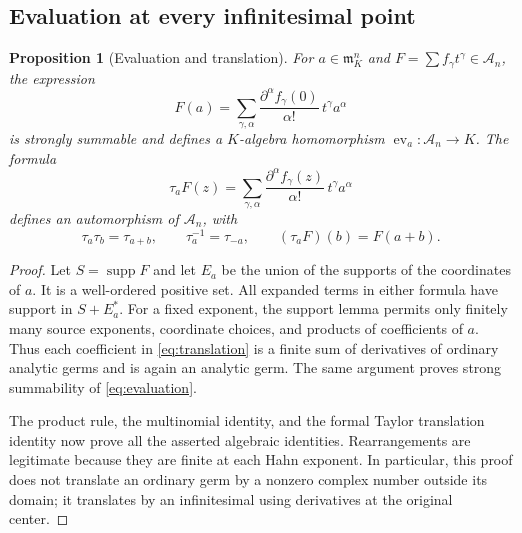 \documentclass[11pt,letterpaper]{article}
\newtheorem{proposition}[proposition]{Proposition}
\theoremstyle{definition}
\theoremstyle{remark}
\newcommand{\A}{\mathscr A}
\newcommand{\m}{\mathfrak m}
\newcommand{\supp}{\operatorname{supp}}
\newcommand{\ev}{\operatorname{ev}}
\numberwithin{equation}{section}
\begin{document}
\subsection{Evaluation at every infinitesimal point}
\begin{proposition}[Evaluation and translation]\label{prop:translation}
For $a\in\m_K^n$ and $F=\sum f_\gamma t^\gamma\in\A_n$, the expression
\begin{equation}\label{eq:evaluation}
 F(a)=\sum_{\gamma,\alpha}
 \frac{\partial^\alpha f_\gamma(0)}{\alpha!}\,t^\gamma a^\alpha
\end{equation}
is strongly summable and defines a $K$-algebra homomorphism $\ev_a:\A_n\to K$. The formula
\begin{equation}\label{eq:translation}
 \tau_aF(z)=\sum_{\gamma,\alpha}
 \frac{\partial^\alpha f_\gamma(z)}{\alpha!}\,t^\gamma a^\alpha
\end{equation}
defines an automorphism of $\A_n$, with
\[
 \tau_a\tau_b=\tau_{a+b},\qquad \tau_a^{-1}=\tau_{-a},\qquad
 (\tau_aF)(b)=F(a+b).
\]
\end{proposition}
\begin{proof}
Let $S=\supp F$ and let $E_a$ be the union of the supports of the coordinates of $a$. It is a well-ordered positive set. All expanded terms in either formula have support in $S+E_a^*$. For a fixed exponent, the support lemma permits only finitely many source exponents, coordinate choices, and products of coefficients of $a$. Thus each coefficient in \eqref{eq:translation} is a finite sum of derivatives of ordinary analytic germs and is again an analytic germ. The same argument proves strong summability of \eqref{eq:evaluation}.

The product rule, the multinomial identity, and the formal Taylor translation identity now prove all the asserted algebraic identities. Rearrangements are legitimate because they are finite at each Hahn exponent. In particular, this proof does not translate an ordinary germ by a nonzero complex number outside its domain; it translates by an infinitesimal using derivatives at the original center.
\end{proof}
\end{document}

